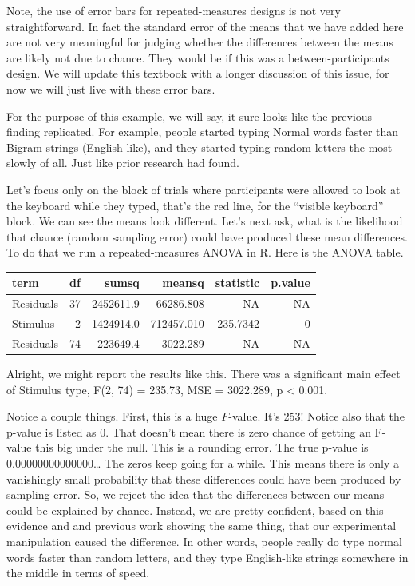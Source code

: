\documentclass[
]{book}
\begin{document}
Note, the use of error bars for repeated-measures designs is not very straightforward. In fact the standard error of the means that we have added here are not very meaningful for judging whether the differences between the means are likely not due to chance. They would be if this was a between-participants design. We will update this textbook with a longer discussion of this issue, for now we will just live with these error bars.

For the purpose of this example, we will say, it sure looks like the previous finding replicated. For example, people started typing Normal words faster than Bigram strings (English-like), and they started typing random letters the most slowly of all. Just like prior research had found.

Let's focus only on the block of trials where participants were allowed to look at the keyboard while they typed, that's the red line, for the ``visible keyboard'' block. We can see the means look different. Let's next ask, what is the likelihood that chance (random sampling error) could have produced these mean differences. To do that we run a repeated-measures ANOVA in R. Here is the ANOVA table.

\begin{tabular}[t]{l|r|r|r|r|r}
\hline
term & df & sumsq & meansq & statistic & p.value\\
\hline
Residuals & 37 & 2452611.9 & 66286.808 & NA & NA\\
\hline
Stimulus & 2 & 1424914.0 & 712457.010 & 235.7342 & 0\\
\hline
Residuals & 74 & 223649.4 & 3022.289 & NA & NA\\
\hline
\end{tabular}

Alright, we might report the results like this. There was a significant main effect of Stimulus type, F(2, 74) = 235.73, MSE = 3022.289, p \textless{} 0.001.

Notice a couple things. First, this is a huge \(F\)-value. It's 253! Notice also that the p-value is listed as 0. That doesn't mean there is zero chance of getting an F-value this big under the null. This is a rounding error. The true p-value is 0.00000000000000\ldots{} The zeros keep going for a while. This means there is only a vanishingly small probability that these differences could have been produced by sampling error. So, we reject the idea that the differences between our means could be explained by chance. Instead, we are pretty confident, based on this evidence and and previous work showing the same thing, that our experimental manipulation caused the difference. In other words, people really do type normal words faster than random letters, and they type English-like strings somewhere in the middle in terms of speed.
\end{document}
